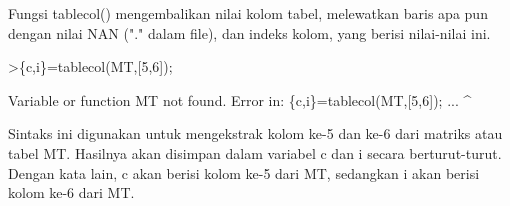 \documentclass[a4paper,10pt]{article}
\begin{document}
\begin{eulernotebook}
\begin{eulercomment}
\begin{eulercomment}
\begin{eulercomment}
\begin{eulercomment}
\begin{eulercomment}
\begin{eulercomment}
\begin{eulercomment}
\begin{eulercomment}
\begin{eulercomment}
\begin{eulercomment}
\begin{eulercomment}
\begin{eulercomment}
\begin{eulercomment}
\begin{eulercomment}
\begin{eulercomment}
\begin{eulercomment}
\begin{eulercomment}
\begin{eulercomment}
\begin{eulercomment}
Fungsi tablecol() mengembalikan nilai kolom tabel, melewatkan baris
apa pun dengan nilai NAN ("." dalam file), dan indeks kolom, yang
berisi nilai-nilai ini.
\end{eulercomment}
\begin{eulerprompt}
>\{c,i\}=tablecol(MT,[5,6]);
\end{eulerprompt}
\begin{euleroutput}
  Variable or function MT not found.
  Error in:
  \{c,i\}=tablecol(MT,[5,6]); ...
                   ^
\end{euleroutput}
\begin{eulercomment}
Sintaks ini digunakan untuk mengekstrak kolom ke-5 dan ke-6 dari
matriks atau tabel MT. Hasilnya akan disimpan dalam variabel c dan i
secara berturut-turut. Dengan kata lain, c akan berisi kolom ke-5 dari
MT, sedangkan i akan berisi kolom ke-6 dari MT.


\end{eulercomment}
\end{eulercomment}
\end{eulercomment}
\end{eulercomment}
\end{eulercomment}
\end{eulercomment}
\end{eulercomment}
\end{eulercomment}
\end{eulercomment}
\end{eulercomment}
\end{eulercomment}
\end{eulercomment}
\end{eulercomment}
\end{eulercomment}
\end{eulercomment}
\end{eulercomment}
\end{eulercomment}
\end{eulercomment}
\end{eulercomment}
\end{eulernotebook}
\end{document}
